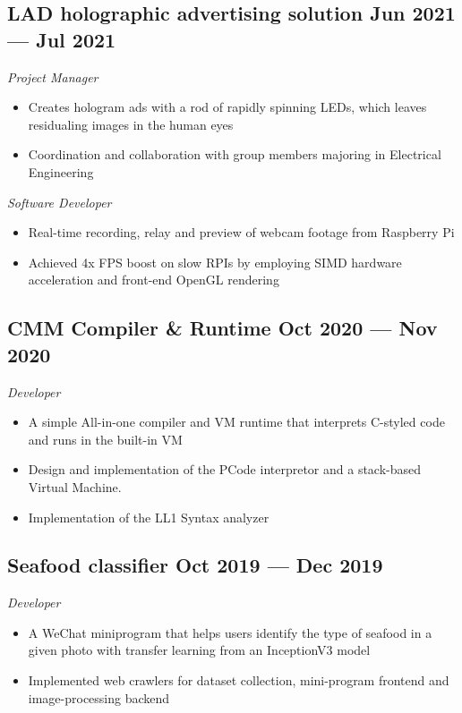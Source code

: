 \documentclass[a4,12pt]{article}
\newcommand{\subtext}[1]{
#1\par\vspace{-0.3cm}}
\newenvironment{zitemize}{
\begin{itemize}\itemsep0pt \parskip0pt \parsep1pt}
{\end{itemize}\vspace{-0.5cm}}
\begin{document}
\subsection*{LAD holographic advertising solution \hfill \textbf{Jun 2021 --- Jul 2021}}
\subtext{\textit{Project Manager}}
\begin{zitemize}
    \item  Creates hologram ads with a rod of rapidly spinning LEDs, which leaves residualing images in the human eyes
    \item Coordination and collaboration with group members majoring in Electrical Engineering
\end{zitemize}

\vspace{0.3cm}
\subtext{\textit{Software Developer}}
\begin{zitemize}
    \item Real-time recording, relay and preview of webcam footage from Raspberry Pi
    \item Achieved 4x FPS boost on slow RPIs by employing SIMD hardware acceleration and front-end OpenGL rendering
\end{zitemize}

\subsection*{CMM Compiler \& Runtime  \hfill \textbf{Oct 2020 --- Nov 2020}}
\subtext{\textit{Developer}}
\begin{zitemize}
    \item  A simple All-in-one compiler and VM runtime that interprets C-styled code and runs in the built-in VM
    \item Design and implementation of the PCode interpretor and a stack-based Virtual Machine.
    \item Implementation of the LL1 Syntax analyzer
\end{zitemize}

\subsection*{Seafood classifier \hfill \textbf{Oct 2019 --- Dec 2019}}
\subtext{\textit{Developer}}
\begin{zitemize}
    \item A WeChat miniprogram that helps users identify the type of seafood in a given photo with transfer learning from an InceptionV3 model 
    \item Implemented web crawlers for dataset collection, mini-program frontend and image-processing backend
\end{zitemize}
\end{document}
